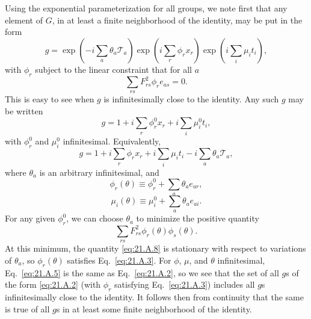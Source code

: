 Using the exponential parameterization for all groups, we note first that
any element of $G$, in at least a finite neighborhood of the identity, may be
put in the form
\begin{equation}
 g=\exp\left(-i\sum_a\theta_a\mathcal T_a\right)
 \exp\left(i\sum_r\phi_r x_r\right)
 \exp\left(i\sum_i\mu_i t_i\right),
 \tag{21.A.2}\label{eq:21.A.2}
\end{equation}
with $\phi_r$ subject to the linear constraint that for all $a$
\begin{equation}
 \sum_{rs}F_{rs}^2\phi_r e_{a s}=0.
 \tag{21.A.3}\label{eq:21.A.3}
\end{equation}
This is easy to see when $g$ is infinitesimally close to the identity. Any such
$g$ may be written
\begin{equation}
 g=1+i\sum_r\phi_r^0x_r+i\sum_i\mu_i^0t_i,
 \tag{21.A.4}\label{eq:21.A.4}
\end{equation}
with $\phi_r^0$ and $\mu_i^0$ infinitesimal. Equivalently,
\begin{equation}
 g=1+i\sum_r\phi_rx_r+i\sum_i\mu_it_i
 -i\sum_a\theta_a\mathcal T_a,
 \tag{21.A.5}\label{eq:21.A.5}
\end{equation}
where $\theta_a$ is an arbitrary infinitesimal, and
\begin{equation}
 \phi_r(\theta)\equiv\phi_r^0+\sum_a\theta_a e_{a r},
 \tag{21.A.6}\label{eq:21.A.6}
\end{equation}
\begin{equation}
 \mu_i(\theta)\equiv\mu_i^0+\sum_a\theta_a e_{a i}.
 \tag{21.A.7}\label{eq:21.A.7}
\end{equation}
For any given $\phi_r^0$, we can choose $\theta_a$ to minimize the positive
quantity
\begin{equation}
 \sum_{rs}F_{rs}^2\phi_r(\theta)\phi_s(\theta).
 \tag{21.A.8}\label{eq:21.A.8}
\end{equation}
At this minimum, the quantity \eqref{eq:21.A.8} is stationary with respect to
variations of $\theta_a$, so $\phi_r(\theta)$ satisfies
Eq.~\eqref{eq:21.A.3}. For $\phi$, $\mu$, and $\theta$ infinitesimal,
Eq.~\eqref{eq:21.A.5} is the same as Eq.~\eqref{eq:21.A.2}, so we see that the
set of all $g$s of the form \eqref{eq:21.A.2} (with $\phi_r$ satisfying
Eq.~\eqref{eq:21.A.3}) includes all $g$s infinitesimally close to the identity.
It follows then from continuity that the same is true of all $g$s in at least
some finite neighborhood of the identity.

